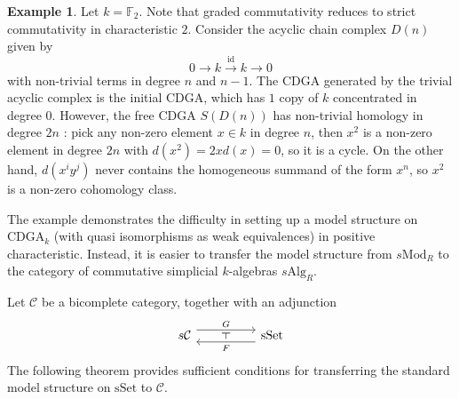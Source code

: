 \documentclass{article}
\theoremstyle{definition}
\theoremstyle{definition}
\theoremstyle{definition}
\theoremstyle{definition}
\theoremstyle{definition}
\theoremstyle{definition}
\theoremstyle{definition}
\newtheorem{example}{Example}[theorem]
\begin{document}
\begin{example}
	Let $k= \mathbb{F}_2$. Note that graded commutativity reduces to strict commutativity in characteristic $2$. Consider the acyclic chain complex $D(n)$ given by  
	\[0\to k\xrightarrow{\textrm{id}} k\to 0\]
	with non-trivial terms in degree $n$ and $n-1$. The  $\textrm{CDGA}$ generated by the trivial acyclic complex is the initial $\textrm{CDGA}$, which has $1$ copy of $k$ concentrated in degree $0$. However, the free \textrm{CDGA} $S(D(n))$ has non-trivial homology in degree $2n$ : pick any non-zero element $x\in k$ in degree $n$, then $x^2$ is a non-zero element in degree $2n$ with $d(x^2)=2xd(x)=0$, so it is a cycle. On the other hand, $d(x^iy^j)$ never contains the homogeneous summand of the form $x^n$, so $x^2$ is a non-zero cohomology class. 
\end{example}
The example demonstrates the difficulty in setting up a model structure on $\textrm{CDGA}_k$ (with quasi isomorphisms as weak equivalences) in positive characteristic. Instead, it is easier to transfer the model structure from $s\textrm{Mod}_R$ to the category of commutative simplicial $k$-algebras $s\textrm{Alg}_R$. 

Let $\mathcal{C}$ be a bicomplete category, together with an adjunction
	\[\begin{tikzcd} 
	{s\mathcal{C}} && {\textrm{sSet}} 
	\arrow["G"', shift left=2,swap, from=1-1, to=1-3] 
	\arrow["F"', shift left=2,swap, from=1-3, to=1-1]
\arrow[phantom,from=1-1, to=1-3, "\dashv" rotate=90]
 \end{tikzcd}\]
The following theorem provides sufficient conditions for transferring the standard model structure on $\textrm{sSet}$ to $\mathcal{C}$. 
\end{document}
